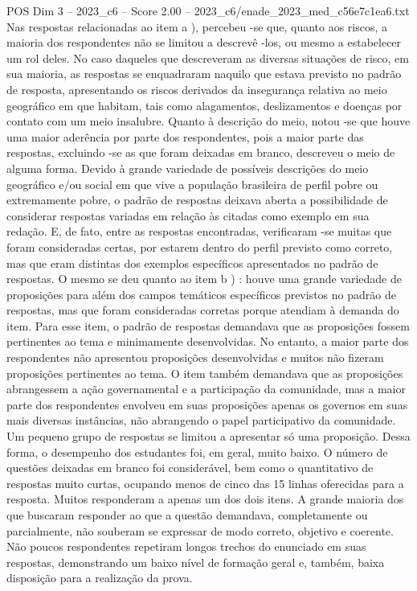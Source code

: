 \begin{textsample}{POS Dim 3 – 2023\_c6 – Score 2.00 – 2023\_c6/enade\_2023\_med\_c56e7c1ea6.txt}
Nas respostas relacionadas ao item a ), percebeu -se que, quanto aos riscos, a maioria dos respondentes não se limitou a descrevê -los, ou mesmo a estabelecer um rol deles.
No caso daqueles que descreveram as diversas situações de risco, em sua maioria, as respostas se enquadraram naquilo que estava previsto no padrão de resposta, apresentando os riscos derivados da insegurança relativa ao meio geográfico em que habitam, tais como alagamentos, deslizamentos e doenças por contato com um meio insalubre.
Quanto à descrição do meio, notou -se que houve uma maior aderência por parte dos respondentes, pois a maior parte das respostas, excluindo -se as que foram deixadas em branco, descreveu o meio de alguma forma.
Devido à grande variedade de possíveis descrições do meio geográfico e/ou social em que vive a população brasileira de perfil pobre ou extremamente pobre, o padrão de respostas deixava aberta a possibilidade de considerar respostas variadas em relação às citadas como exemplo em sua redação.
E, de fato, entre as respostas encontradas, verificaram -se muitas que foram consideradas certas, por estarem dentro do perfil previsto como correto, mas que eram distintas dos exemplos específicos apresentados no padrão de respostas.
O mesmo se deu quanto ao item b ) : houve uma grande variedade de proposições para além dos campos temáticos específicos previstos no padrão de respostas, mas que foram consideradas corretas porque atendiam à demanda do item.
Para esse item, o padrão de respostas demandava que as proposições fossem pertinentes ao tema e minimamente desenvolvidas.
No entanto, a maior parte dos respondentes não apresentou proposições desenvolvidas e muitos não fizeram proposições pertinentes ao tema.
O item também demandava que as proposições abrangessem a ação governamental e a participação da comunidade, mas a maior parte dos respondentes envolveu em suas proposições apenas os governos em suas mais diversas instâncias, não abrangendo o papel participativo da comunidade.
Um pequeno grupo de respostas se limitou a apresentar só uma proposição.
Dessa forma, o desempenho dos estudantes foi, em geral, muito baixo.
O número de questões deixadas em branco foi considerável, bem como o quantitativo de respostas muito curtas, ocupando menos de cinco das 15 linhas oferecidas para a resposta.
Muitos responderam a apenas um dos dois itens.
A grande maioria dos que buscaram responder ao que a questão demandava, completamente ou parcialmente, não souberam se expressar de modo correto, objetivo e coerente.
Não poucos respondentes repetiram longos trechos do enunciado em suas respostas, demonstrando um baixo nível de formação geral e, também, baixa disposição para a realização da prova.

\end{textsample}
